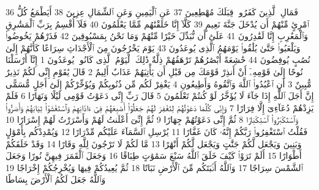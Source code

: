 {\tiny\colorbox{cl_aya}{36}} فَمَالِ ٱلَّذِينَ كَفَرُوا۟ قِبَلَكَ مُهْطِعِينَ
{\tiny\colorbox{cl_aya}{37}} عَنِ ٱلْيَمِينِ وَعَنِ ٱلشِّمَالِ عِزِينَ
{\tiny\colorbox{cl_aya}{38}} أَيَطْمَعُ كُلُّ ٱمْرِئٍ مِّنْهُمْ أَن يُدْخَلَ جَنَّةَ نَعِيمٍ
{\tiny\colorbox{cl_aya}{39}} كَلَّآ إِنَّا خَلَقْنَٰهُم مِّمَّا يَعْلَمُونَ
{\tiny\colorbox{cl_aya}{40}} فَلَآ أُقْسِمُ بِرَبِّ ٱلْمَشَٰرِقِ وَٱلْمَغَٰرِبِ إِنَّا لَقَٰدِرُونَ
{\tiny\colorbox{cl_aya}{41}} عَلَىٰٓ أَن نُّبَدِّلَ خَيْرًا مِّنْهُمْ وَمَا نَحْنُ بِمَسْبُوقِينَ
{\tiny\colorbox{cl_aya}{42}} فَذَرْهُمْ يَخُوضُوا۟ وَيَلْعَبُوا۟ حَتَّىٰ يُلَٰقُوا۟ يَوْمَهُمُ ٱلَّذِى يُوعَدُونَ
{\tiny\colorbox{cl_aya}{43}} يَوْمَ يَخْرُجُونَ مِنَ ٱلْأَجْدَاثِ سِرَاعًا كَأَنَّهُمْ إِلَىٰ نُصُبٍ يُوفِضُونَ
{\tiny\colorbox{cl_aya}{44}} خَٰشِعَةً أَبْصَٰرُهُمْ تَرْهَقُهُمْ ذِلَّةٌ ذَٰلِكَ ٱلْيَوْمُ ٱلَّذِى كَانُوا۟ يُوعَدُونَ
{\tiny\colorbox{cl_aya}{1}} إِنَّآ أَرْسَلْنَا نُوحًا إِلَىٰ قَوْمِهِۦٓ أَنْ أَنذِرْ قَوْمَكَ مِن قَبْلِ أَن يَأْتِيَهُمْ عَذَابٌ أَلِيمٌ
{\tiny\colorbox{cl_aya}{2}} قَالَ يَٰقَوْمِ إِنِّى لَكُمْ نَذِيرٌ مُّبِينٌ
{\tiny\colorbox{cl_aya}{3}} أَنِ ٱعْبُدُوا۟ ٱللَّهَ وَٱتَّقُوهُ وَأَطِيعُونِ
{\tiny\colorbox{cl_aya}{4}} يَغْفِرْ لَكُم مِّن ذُنُوبِكُمْ وَيُؤَخِّرْكُمْ إِلَىٰٓ أَجَلٍ مُّسَمًّى إِنَّ أَجَلَ ٱللَّهِ إِذَا جَآءَ لَا يُؤَخَّرُ لَوْ كُنتُمْ تَعْلَمُونَ
{\tiny\colorbox{cl_aya}{5}} قَالَ رَبِّ إِنِّى دَعَوْتُ قَوْمِى لَيْلًا وَنَهَارًا
{\tiny\colorbox{cl_aya}{6}} فَلَمْ يَزِدْهُمْ دُعَآءِىٓ إِلَّا فِرَارًا
{\tiny\colorbox{cl_aya}{7}} وَإِنِّى كُلَّمَا دَعَوْتُهُمْ لِتَغْفِرَ لَهُمْ جَعَلُوٓا۟ أَصَٰبِعَهُمْ فِىٓ ءَاذَانِهِمْ وَٱسْتَغْشَوْا۟ ثِيَابَهُمْ وَأَصَرُّوا۟ وَٱسْتَكْبَرُوا۟ ٱسْتِكْبَارًا
{\tiny\colorbox{cl_aya}{8}} ثُمَّ إِنِّى دَعَوْتُهُمْ جِهَارًا
{\tiny\colorbox{cl_aya}{9}} ثُمَّ إِنِّىٓ أَعْلَنتُ لَهُمْ وَأَسْرَرْتُ لَهُمْ إِسْرَارًا
{\tiny\colorbox{cl_aya}{10}} فَقُلْتُ ٱسْتَغْفِرُوا۟ رَبَّكُمْ إِنَّهُۥ كَانَ غَفَّارًا
{\tiny\colorbox{cl_aya}{11}} يُرْسِلِ ٱلسَّمَآءَ عَلَيْكُم مِّدْرَارًا
{\tiny\colorbox{cl_aya}{12}} وَيُمْدِدْكُم بِأَمْوَٰلٍ وَبَنِينَ وَيَجْعَل لَّكُمْ جَنَّٰتٍ وَيَجْعَل لَّكُمْ أَنْهَٰرًا
{\tiny\colorbox{cl_aya}{13}} مَّا لَكُمْ لَا تَرْجُونَ لِلَّهِ وَقَارًا
{\tiny\colorbox{cl_aya}{14}} وَقَدْ خَلَقَكُمْ أَطْوَارًا
{\tiny\colorbox{cl_aya}{15}} أَلَمْ تَرَوْا۟ كَيْفَ خَلَقَ ٱللَّهُ سَبْعَ سَمَٰوَٰتٍ طِبَاقًا
{\tiny\colorbox{cl_aya}{16}} وَجَعَلَ ٱلْقَمَرَ فِيهِنَّ نُورًا وَجَعَلَ ٱلشَّمْسَ سِرَاجًا
{\tiny\colorbox{cl_aya}{17}} وَٱللَّهُ أَنۢبَتَكُم مِّنَ ٱلْأَرْضِ نَبَاتًا
{\tiny\colorbox{cl_aya}{18}} ثُمَّ يُعِيدُكُمْ فِيهَا وَيُخْرِجُكُمْ إِخْرَاجًا
{\tiny\colorbox{cl_aya}{19}} وَٱللَّهُ جَعَلَ لَكُمُ ٱلْأَرْضَ بِسَاطًا
